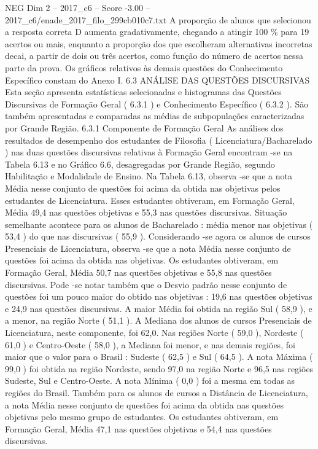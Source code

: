 \begin{textsample}{NEG Dim 2 – 2017\_c6 – Score -3.00 – 2017\_c6/enade\_2017\_filo\_299cb010c7.txt}
A proporção de alunos que selecionou a resposta correta D aumenta gradativamente, chegando a atingir 100 \% para 19 acertos ou mais, enquanto a proporção dos que escolheram alternativas incorretas decai, a partir de dois ou três acertos, como função do número de acertos nessa parte da prova.
Os gráficos relativos às demais questões do Conhecimento Específico constam do Anexo I. 6.3 ANÁLISE DAS QUESTÕES DISCURSIVAS Esta seção apresenta estatísticas selecionadas e histogramas das Questões Discursivas de Formação Geral ( 6.3.1 ) e Conhecimento Específico ( 6.3.2 ).
São também apresentadas e comparadas as médias de subpopulações caracterizadas por Grande Região. 6.3.1 Componente de Formação Geral As análises dos resultados de desempenho dos estudantes de Filosofia ( Licenciatura/Bacharelado ) nas duas questões discursivas relativas à Formação Geral encontram -se na Tabela 6.13 e no Gráfico 6.6, desagregadas por Grande Região, segundo Habilitação e Modalidade de Ensino.
Na Tabela 6.13, observa -se que a nota Média nesse conjunto de questões foi acima da obtida nas objetivas pelos estudantes de Licenciatura.
Esses estudantes obtiveram, em Formação Geral, Média 49,4 nas questões objetivas e 55,3 nas questões discursivas.
Situação semelhante acontece para os alunos de Bacharelado : média menor nas objetivas ( 53,4 ) do que nas discursivas ( 55,9 ).
Considerando -se agora os alunos de cursos Presenciais de Licenciatura, observa -se que a nota Média nesse conjunto de questões foi acima da obtida nas objetivas.
Os estudantes obtiveram, em Formação Geral, Média 50,7 nas questões objetivas e 55,8 nas questões discursivas.
Pode -se notar também que o Desvio padrão nesse conjunto de questões foi um pouco maior do obtido nas objetivas : 19,6 nas questões objetivas e 24,9 nas questões discursivas.
A maior Média foi obtida na região Sul ( 58,9 ), e a menor, na região Norte ( 51,1 ).
A Mediana dos alunos de cursos Presenciais de Licenciatura, neste componente, foi 62,0.
Nas regiões Norte ( 59,0 ), Nordeste ( 61,0 ) e Centro-Oeste ( 58,0 ), a Mediana foi menor, e nas demais regiões, foi maior que o valor para o Brasil : Sudeste ( 62,5 ) e Sul ( 64,5 ).
A nota Máxima ( 99,0 ) foi obtida na região Nordeste, sendo 97,0 na região Norte e 96,5 nas regiões Sudeste, Sul e Centro-Oeste.
A nota Mínima ( 0,0 ) foi a mesma em todas as regiões do Brasil.
Também para os alunos de cursos a Distância de Licenciatura, a nota Média nesse conjunto de questões foi acima da obtida nas questões objetivas pelo mesmo grupo de estudantes.
Os estudantes obtiveram, em Formação Geral, Média 47,1 nas questões objetivas e 54,4 nas questões discursivas.

\end{textsample}
